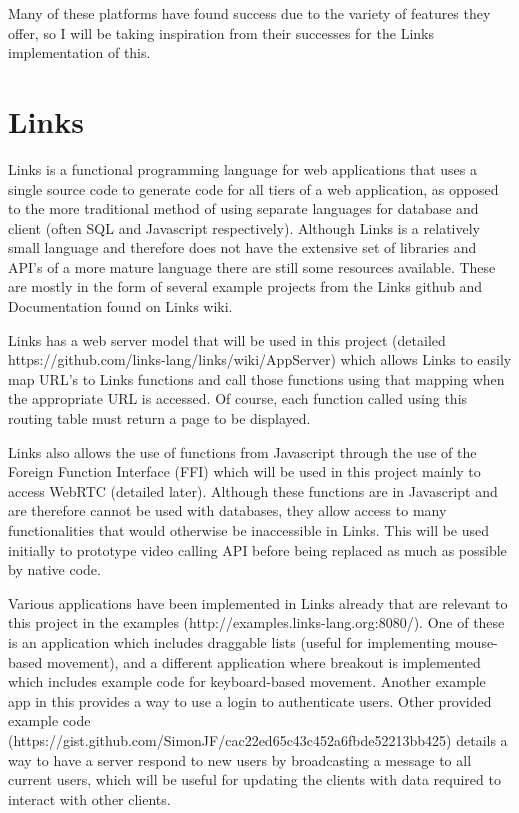 \documentclass[bsc,frontabs,singlespacing,parskip,deptreport]{infthesis}
\begin{document}
Many of these platforms have found success due to the variety of features they offer, so I will be taking inspiration from their successes for the Links implementation of this.

\section{Links}

Links is a functional programming language for web applications that uses a single source code to generate code for all tiers of a web application, as opposed to the more traditional method of using separate languages for database and client (often SQL and Javascript respectively).  Although Links is a relatively small language and therefore does not have the extensive set of libraries and API’s of a more mature language there are still some resources available.  These are mostly in the form of several example projects from the Links github and Documentation found on Links wiki.

Links has a web server model that will be used in this project (detailed https://github.com/links-lang/links/wiki/AppServer) which allows Links to easily map URL’s to Links functions and call those functions using that mapping when the appropriate URL is accessed.  Of course, each function called using this routing table must return a page to be displayed.

Links also allows the use of functions from Javascript through the use of the Foreign Function Interface (FFI) which will be used in this project mainly to access WebRTC (detailed later).  Although these functions are in Javascript and are therefore cannot be used with databases, they allow access to many functionalities that would otherwise be inaccessible in Links.  This will be used initially to prototype video calling API before being replaced as much as possible by native code.

Various applications have been implemented in Links already that are relevant to this project in the examples (http://examples.links-lang.org:8080/).  One of these is an application which includes draggable lists (useful for implementing mouse-based movement), and a different application where breakout is implemented which includes example code for keyboard-based movement.  Another example app in this provides a way to use a login to authenticate users.  Other provided example code (https://gist.github.com/SimonJF/cac22ed65c43c452a6fbde52213bb425) details a way to have a server respond to new users by broadcasting a message to all current users, which will be useful for updating the clients with data required to interact with other clients.
\end{document}
